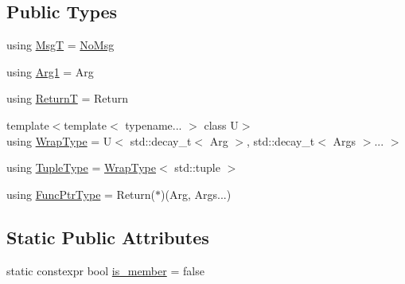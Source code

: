 \subsection*{Public Types}
\begin{DoxyCompactItemize}
\item 
using \hyperlink{structvt_1_1util_1_1fntraits_1_1detail_1_1_functor_traits_impl_3_01std_1_1enable__if__t_3_01not_ff7bf429a58012799da4cee5038d568d_a2edaf8a30b091e56906908ef1af1c0cc}{MsgT} = \hyperlink{structvt_1_1util_1_1fntraits_1_1detail_1_1_no_msg}{No\+Msg}
\item 
using \hyperlink{structvt_1_1util_1_1fntraits_1_1detail_1_1_functor_traits_impl_3_01std_1_1enable__if__t_3_01not_ff7bf429a58012799da4cee5038d568d_a371f7495a64a266199bcb42758bb2e52}{Arg1} = Arg
\item 
using \hyperlink{structvt_1_1util_1_1fntraits_1_1detail_1_1_functor_traits_impl_3_01std_1_1enable__if__t_3_01not_ff7bf429a58012799da4cee5038d568d_a4ab930f609baf97c0a23ed9fd273f322}{ReturnT} = Return
\item 
{\footnotesize template$<$template$<$ typename... $>$ class U$>$ }\\using \hyperlink{structvt_1_1util_1_1fntraits_1_1detail_1_1_functor_traits_impl_3_01std_1_1enable__if__t_3_01not_ff7bf429a58012799da4cee5038d568d_af568c800c3dc13d04dce33d8fe8886ba}{Wrap\+Type} = U$<$ std\+::decay\+\_\+t$<$ Arg $>$, std\+::decay\+\_\+t$<$ Args $>$... $>$
\item 
using \hyperlink{structvt_1_1util_1_1fntraits_1_1detail_1_1_functor_traits_impl_3_01std_1_1enable__if__t_3_01not_ff7bf429a58012799da4cee5038d568d_ae99e25bb3ddd6fc8a8a132e79ee61439}{Tuple\+Type} = \hyperlink{structvt_1_1util_1_1fntraits_1_1detail_1_1_functor_traits_impl_3_01std_1_1enable__if__t_3_01not_ff7bf429a58012799da4cee5038d568d_af568c800c3dc13d04dce33d8fe8886ba}{Wrap\+Type}$<$ std\+::tuple $>$
\item 
using \hyperlink{structvt_1_1util_1_1fntraits_1_1detail_1_1_functor_traits_impl_3_01std_1_1enable__if__t_3_01not_ff7bf429a58012799da4cee5038d568d_a2cabfb292c5b20741e8e2c94215e18c7}{Func\+Ptr\+Type} = Return($\ast$)(Arg, Args...)
\end{DoxyCompactItemize}
\subsection*{Static Public Attributes}
\begin{DoxyCompactItemize}
\item 
static constexpr bool \hyperlink{structvt_1_1util_1_1fntraits_1_1detail_1_1_functor_traits_impl_3_01std_1_1enable__if__t_3_01not_ff7bf429a58012799da4cee5038d568d_ac8507a79658ed57ef3d8a456aecfa0f2}{is\+\_\+member} = false
\end{DoxyCompactItemize}


